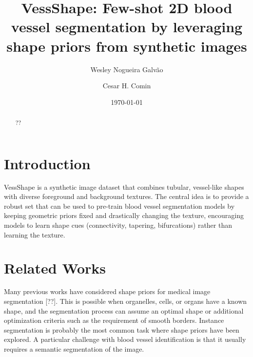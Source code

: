 \documentclass[%
reprint,
nofootinbib,
 amsmath,amssymb,
aps,
superscriptaddress,
showkeys,
longbibliography
]{revtex4-1}
\begin{document}



\title{VessShape: Few-shot 2D blood vessel segmentation by leveraging shape priors from synthetic images}

\author{Wesley Nogueira Galvão}


\author{Cesar H. Comin}

\date{\today}%

\begin{abstract}

??

\end{abstract}


\maketitle
\thispagestyle{plain}

\section{Introduction}
\label{sec:introduction}

VessShape is a synthetic image dataset that combines tubular, vessel-like shapes with diverse foreground and background textures. The central idea is to provide a robust set that can be used to pre-train blood vessel segmentation models by keeping geometric priors fixed and drastically changing the texture, encouraging models to learn shape cues (connectivity, tapering, bifurcations) rather than learning the texture.


\section{Related Works}
\label{sec:related}

Many previous works have considered shape priors for medical image segmentation [??]. This is possible when organelles, cells, or organs have a known shape, and the segmentation process can assume an optimal shape or additional optimization criteria such as the requirement of smooth borders. Instance segmentation is probably the most common task where shape priors have been explored. A particular challenge with blood vessel identification is that it usually requires a semantic segmentation of the image. 
\end{document}
